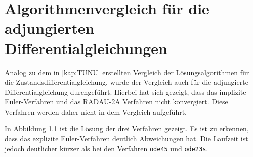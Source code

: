 \chapter{Algorithmenvergleich für die adjungierten Differentialgleichungen}\label{appendix:methods}
Analog zu dem in \autoref{kap:TUNU} erstellten Vergleich der Lösungsalgorithmen für die Zustandsdifferentialgleichung, wurde der Vergleich auch für die adjungierte Differentialgleichung durchgeführt.
Hierbei hat sich gezeigt, dass das implizite Euler-Verfahren und das RADAU-2A Verfahren nicht konvergiert. Diese Verfahren werden daher nicht in dem Vergleich aufgeführt.

In Abbildung \ref{fig:methods_indirect} ist die Lösung der drei Verfahren gezeigt. Es ist zu erkennen, dass das explizite Euler-Verfahren deutlich Abweichungen hat. Die Laufzeit ist jedoch deutlicher kürzer als bei den Verfahren \verb+ode45+ und \verb+ode23s+.

\begin{figure}[htbp]
    \centering 
    \qquad
     \\

    \qquad
     \\

    \qquad
     \\

    \qquad
     \\

     \label{fig:methods_indirect}
\end{figure}

